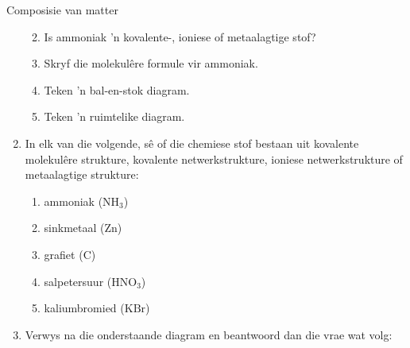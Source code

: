 \begin{eocexercises}{Composisie van matter}
\begin{enumerate}[noitemsep, label=\textbf{\arabic*}. ]
\begin{enumerate}[noitemsep, label=\textbf{\alph*}. ]
            \label{m38120*uid94}\item Is ammoniak 'n kovalente-, ioniese of metaalagtige stof?
\label{m38120*uid95}\item Skryf die molekul\^{e}re formule vir ammoniak.
\label{m38120*uid96}\item Teken 'n bal-en-stok diagram.
\label{m38120*uid97}\item Teken 'n ruimtelike diagram.
\end{enumerate}
            \label{m38120*uid11}\item In elk van die volgende, sê of die chemiese stof bestaan uit kovalente molekul\^{e}re strukture, kovalente netwerkstrukture, ioniese netwerkstrukture of metaalagtige strukture:
\label{m38120*id308055}\begin{enumerate}[noitemsep, label=\textbf{\alph*}. ] 
            \label{m38120*uid12}\item ammoniak (${\text{NH}}_{3}$)
\label{m38120*uid13}\item sinkmetaal ($\text{Zn}$)
\label{m38120*uid14}\item grafiet ($\text{C}$)
\label{m38120*uid15}\item salpetersuur (${\text{HNO}}_{3}$)
\label{m38120*uid16}\item kaliumbromied ($\text{KBr}$)
\end{enumerate}
\label{m38120*uid17}\item Verwys na die onderstaande diagram en beantwoord dan die vrae wat volg:
    \setcounter{subfigure}{0}
	\begin{figure}[H] %
\begin{center}
\end{center}
\end{figure}
\end{enumerate}
\end{eocexercises}
